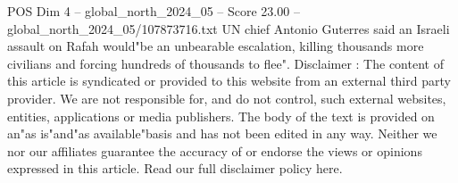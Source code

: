 \begin{textsample}{POS Dim 4 – global\_north\_2024\_05 – Score 23.00 – global\_north\_2024\_05/107873716.txt}
UN chief Antonio Guterres said an Israeli assault on Rafah would"be an unbearable escalation, killing thousands more civilians and forcing hundreds of thousands to flee".
Disclaimer : The content of this article is syndicated or provided to this website from an external third party provider.
We are not responsible for, and do not control, such external websites, entities, applications or media publishers.
The body of the text is provided on an"as is"and"as available"basis and has not been edited in any way.
Neither we nor our affiliates guarantee the accuracy of or endorse the views or opinions expressed in this article.
Read our full disclaimer policy here.

\end{textsample}
